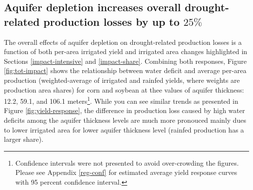 \documentclass[
]{article}
\begin{document}
\hypertarget{aquifer-depletion-increases-overall-drought-related-production-losses-by-up-to-25}{%
\subsection{\texorpdfstring{Aquifer depletion increases overall drought-related production losses by up to \(25\%\)}{Aquifer depletion increases overall drought-related production losses by up to 25\textbackslash\%}}\label{aquifer-depletion-increases-overall-drought-related-production-losses-by-up-to-25}}

The overall effects of aquifer depletion on drought-related production losses is a function of both per-area irrigated yield and irrigated area changes highlighted in Sections \ref{impact-intensive} and \ref{impact-share}. Combining both responses, Figure \ref{fig:tot-impact} shows the relationship between water deficit and average per-area production (weighted-average of irrigated and rainfed yields, where weights are production area shares) for corn and soybean at thee values of aquifer thickness: 12.2, 59.1, and 106.1 meters\footnote{Confidence intervals were not presented to avoid over-crowding the figures. Please see Appendix \ref{reg-conf} for estimated average yield response curves with 95 percent confidence interval.}. While you can see similar trends as presented in Figure \ref{fig:yield-response}, the difference in production loss caused by high water deficits among the aquifer thickness levels are much more pronouced mainly dues to lower irrigated area for lower aquifer thickness level (rainfed production has a larger share).
\end{document}
